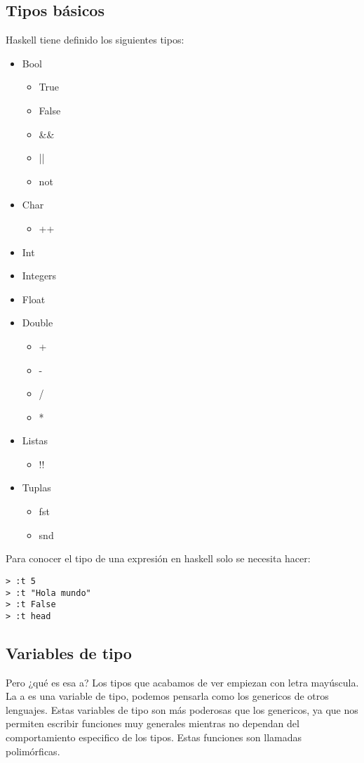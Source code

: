 \documentclass[11pt]{article}
\begin{document}
\subsection{Tipos básicos}
\label{sec:orgd4f52b4}
Haskell tiene definido los siguientes tipos:
\begin{itemize}
\item Bool
\begin{itemize}
\item True
\item False
\item \&\&
\item ||
\item not
\end{itemize}
\item Char
\begin{itemize}
\item ++
\end{itemize}
\item Int
\item Integers
\item Float
\item Double
\begin{itemize}
\item +
\item -
\item /
\item *
\end{itemize}
\item Listas
\begin{itemize}
\item !!
\end{itemize}
\item Tuplas
\begin{itemize}
\item fst
\item snd
\end{itemize}
\end{itemize}

Para conocer el tipo de una expresión  en haskell solo se necesita hacer:
\begin{verbatim}
> :t 5
> :t "Hola mundo"
> :t False
> :t head
\end{verbatim}
\subsection{Variables de tipo}
\label{sec:org5e3696e}
Pero ¿qué es esa a? Los tipos que acabamos de ver empiezan con letra mayúscula.
La a es una variable de tipo, podemos pensarla como los genericos de otros lenguajes.
Estas variables de tipo son más poderosas que los genericos, ya que nos 
permiten escribir funciones muy generales mientras no dependan del comportamiento
especifico de los tipos. Estas funciones son llamadas polimórficas.
\end{document}
